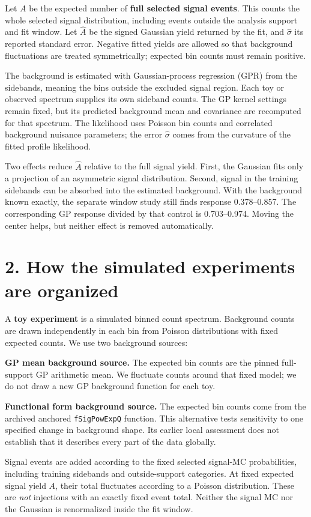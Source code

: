 \documentclass[11pt]{article}
\newcommand{\Ah}{\widehat A}\newcommand{\sh}{\widehat\sigma}
\begin{document}
Let $A$ be the expected number of \textbf{full selected signal events}. This counts the whole selected signal distribution, including events outside the analysis support and fit window. Let $\Ah$ be the signed Gaussian yield returned by the fit, and $\sh$ its reported standard error. Negative fitted yields are allowed so that background fluctuations are treated symmetrically; expected bin counts must remain positive.

The background is estimated with Gaussian-process regression (GPR) from the sidebands, meaning the bins outside the excluded signal region. Each toy or observed spectrum supplies its own sideband counts. The GP kernel settings remain fixed, but its predicted background mean and covariance are recomputed for that spectrum. The likelihood uses Poisson bin counts and correlated background nuisance parameters; the error $\sh$ comes from the curvature of the fitted profile likelihood.

Two effects reduce $\Ah$ relative to the full signal yield. First, the Gaussian fits only a projection of an asymmetric signal distribution. Second, signal in the training sidebands can be absorbed into the estimated background. With the background known exactly, the separate window study still finds response 0.378--0.857. The corresponding GP response divided by that control is 0.703--0.974. Moving the center helps, but neither effect is removed automatically.
\clearpage\section*{2. How the simulated experiments are organized}

A \textbf{toy experiment} is a simulated binned count spectrum. Background counts are drawn independently in each bin from Poisson distributions with fixed expected counts. We use two background sources:

\textbf{GP mean background source.} The expected bin counts are the pinned full-support GP arithmetic mean. We fluctuate counts around that fixed model; we do not draw a new GP background function for each toy.

\textbf{Functional form background source.} The expected bin counts come from the archived anchored \texttt{fSigPowExpQ} function. This alternative tests sensitivity to one specified change in background shape. Its earlier local assessment does not establish that it describes every part of the data globally.

Signal events are added according to the fixed selected signal-MC probabilities, including training sidebands and outside-support categories. At fixed expected signal yield $A$, their total fluctuates according to a Poisson distribution. These are \emph{not} injections with an exactly fixed event total. Neither the signal MC nor the Gaussian is renormalized inside the fit window.
\end{document}
